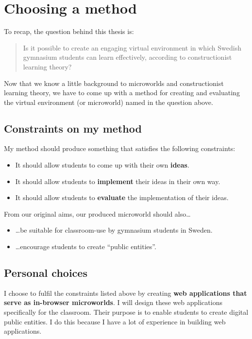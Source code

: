 \section{Choosing a method}

To recap, the question behind this thesis is:
\begin{quote}
Is it possible to create an engaging virtual environment in which Swedish gymnasium students can learn effectively, according to constructionist learning theory?
\end{quote}

Now that we know a little background to microworlds and constructionist learning theory, we have to come up with a method for creating and evaluating the virtual environment (or microworld) named in the question above.

\subsection{Constraints on my method}

My method should produce something that satisfies the following constraints:
\begin{itemize}
  \item It should allow students to come up with their own \textbf{ideas}.
  \item It should allow students to \textbf{implement} their ideas in their own way.
  \item It should allow students to \textbf{evaluate} the implementation of their ideas.
\end{itemize}

From our original aims, our produced microworld should also\ldots
\begin{itemize}
  \item \ldots be suitable for classroom-use by gymnasium students in Sweden.
  \item \ldots encourage students to create ``public entities''.
\end{itemize}

\subsection{Personal choices}

I choose to fulfil the constraints listed above by creating \textbf{web applications that serve as in-browser microworlds}. I will design these web applications specifically for the classroom. Their purpose is to enable students to create digital public entities. I do this because I have a lot of experience in building web applications.

